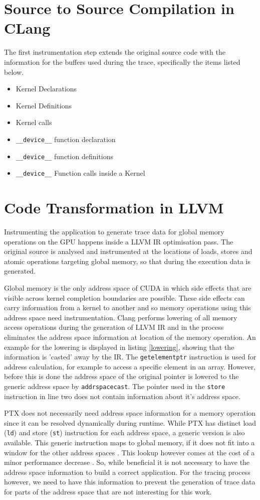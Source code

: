 \section{Source to Source Compilation in CLang}\label{sec:impl:clang}
The first instrumentation step extends the original source code with the information for the buffers used during the trace, specifically the items listed below.
\begin{itemize}
	\item Kernel Declarations
	\item Kernel Definitions
	\item Kernel calls
	\item \verb|__device__| function declaration
	\item \verb|__device__| function definitions
	\item \verb|__device__| Function calls inside a Kernel
\end{itemize}

\section{Code Transformation in LLVM}\label{impl:llvm}
Instrumenting the application to generate trace data for global memory operations on the GPU happens inside a LLVM IR optimisation pass. The original source is analysed and instrumented at the locations of loads, stores and atomic operations targeting global memory, so that during the execution data is generated.

Global memory is the only address space of CUDA in which side effects that are visible across kernel completion boundaries are possible. These side effects can carry information from a kernel to another and so memory operations using this address space need instrumentation. Clang performs lowering of all memory access operations during the generation of LLVM IR and in the process eliminates the address space information at location of the memory operation. An example for the lowering is displayed in listing \ref{lowering}, showing that the information is 'casted' away by the IR. The \verb|getelementptr| instruction is used
for address calculation, for example to access a specific element in an array. However, before this is done
the address space of the original pointer is lowered to the generic address space by \verb|addrspacecast|. The pointer used in the \verb|store| instruction in line two does not contain information about it's address space.
 
PTX does not necessarily need address space information for a memory operation since it can be resolved dynamically during runtime. While PTX has distinct load (\verb|ld|) and store (\verb|st|) instruction for
each address space, a generic version is also available. This generic instruction maps to global memory, if
it does not fit into a window for the other address spaces \cite{ptx isa}. This lookup however comes at the cost of a minor performance decrease \cite{infer-pass}. So, while beneficial it is not necessary to
have the address space information to build a correct application. For the tracing process however, we need to have this information to prevent the generation of trace data for parts of the address space that are not interesting for this work.

